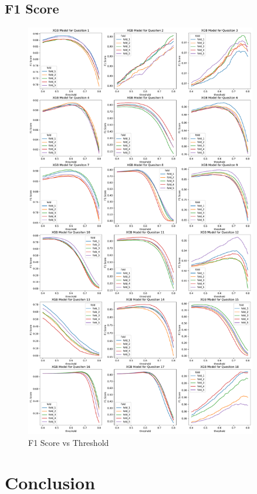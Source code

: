 \documentclass[11pt,a4paper]{article}
\begin{document}
    \subsection{F1 Score}
    \begin{figure}[H]
        \centering
        \includegraphics[width = 0.9\textwidth]{model_plot/f1_threshold.pdf}
        \caption{F1 Score vs Threshold}
        \label{fig:f1_score}
    \end{figure}

    \section{Conclusion}
\end{document}
